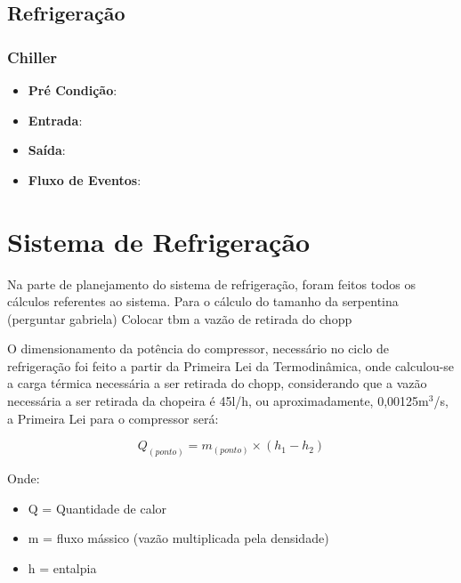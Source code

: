         \subsection[Refrigeração]{Refrigeração}
            \subsubsection[Chiller]{Chiller}
                \begin{itemize}
                    \item \textbf{Pré Condição}:
                    \item \textbf{Entrada}:
                    \item \textbf{Saída}: 
                    \item \textbf{Fluxo de Eventos}:
                \end{itemize}

        \section[Sistema de Refrigeração]{Sistema de Refrigeração}

            Na parte de planejamento do sistema de refrigeração, foram feitos todos os
            cálculos referentes ao sistema. Para o cálculo do tamanho da serpentina (perguntar
            gabriela) Colocar tbm a vazão de retirada do chopp

            O dimensionamento da potência do compressor, necessário no ciclo de
            refrigeração foi feito a partir da Primeira Lei da Termodinâmica, onde calculou-se a
            carga térmica necessária a ser retirada do chopp, considerando que a vazão
            necessária a ser retirada da chopeira é 45l/h, ou aproximadamente, 0,00125m$^3$/s, a
            Primeira Lei para o compressor será:
            
            \begin{equation}
                Q_{(ponto)} = m_{(ponto)} \times (h_1 - h_2)
            \end{equation}

            Onde:
            \begin{itemize}
                \item Q = Quantidade de calor
                \item m = fluxo mássico (vazão multiplicada pela densidade)
                \item h = entalpia
            \end{itemize}
            
